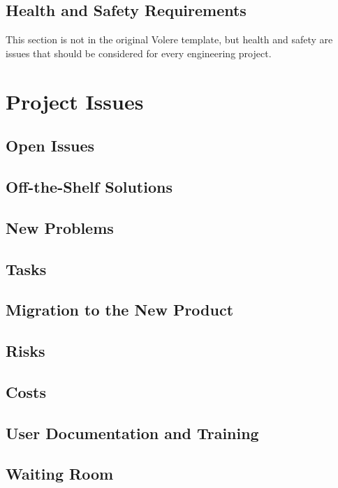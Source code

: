\documentclass[12pt, titlepage]{article}
\begin{document}
\subsection{Health and Safety Requirements}

This section is not in the original Volere template, but health and safety are
issues that should be considered for every engineering project.

\section{Project Issues}

\subsection{Open Issues}

\subsection{Off-the-Shelf Solutions}

\subsection{New Problems}

\subsection{Tasks}

\subsection{Migration to the New Product}

\subsection{Risks}

\subsection{Costs}

\subsection{User Documentation and Training}

\subsection{Waiting Room}
\end{document}
